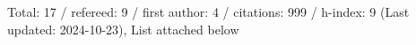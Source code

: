 Total: 17 / refereed: 9 / first author: 4 / citations: 999 / h-index: 9 (Last updated: 2024-10-23), List attached below